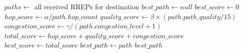 \documentclass[12pt,a4paper]{article}
\begin{document}
\begin{algorithm}
\caption{Multi-Metric Path Selection}
\begin{algorithmic}[1]
\State $paths \gets$ all received RREPs for destination
\State $best\_path \gets null$
\State $best\_score \gets 0$
\State
{}
    \State $hop\_score \gets \alpha / path.hop\_count$
    \State $quality\_score \gets \beta \times (path.path\_quality / 15)$
    \State $congestion\_score \gets \gamma / (path.congestion\_level + 1)$
    \State
    \State $total\_score \gets hop\_score + quality\_score + congestion\_score$
    \State
        \State $best\_score \gets total\_score$
        \State $best\_path \gets path$
    \EndIf
\EndFor
\State
\State \Return $best\_path$
\end{algorithmic}
\end{algorithm}
\end{document}
